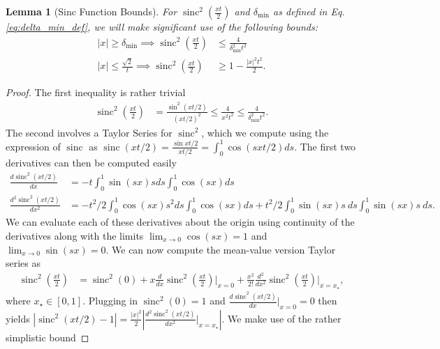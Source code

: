 \documentclass{article}
\newtheorem{lemma}[theorem]{Lemma}
\newcommand{\abs}[1]{\left| #1 \right|}
\DeclareMathOperator{\sinc}{sinc}
\begin{document}
\begin{lemma}[Sinc Function Bounds] \label{lem:sinc_poly_approx}
    For $\sinc^2\left( \frac{x t}{2} \right)$ and $\delta_{\min}$ as defined in Eq. \eqref{eq:delta_min_def}, we will make significant use of the following bounds:
    \begin{align}
        |x| \ge \delta_{\min} \implies \sinc^2 \left( \frac{x t}{2} \right) &\le \frac{4}{\delta_{\min}^2 t^2} \label{eq:sinc_upper_bound} \\
        |x| \le \frac{\sqrt{2}}{t} \implies \sinc^2\left(\frac{x t}{2} \right) &\ge 1 - \frac{|x|^2 t^2}{2}. \label{eq:sinc_lower_bound}
\end{align}

\end{lemma}
\begin{proof}
    The first inequality is rather trivial
    \begin{align}
        \sinc^2 \left( \frac{x t}{2} \right) &= \frac{\sin^2 (x t /2)}{(x t / 2)^2} \le \frac{4}{x^2 t^2} \le \frac{4}{\delta_{\min}^2 t^2}.
    \end{align}
    The second involves a Taylor Series for $\sinc^2$, which we compute using the expression of $\sinc$ as $\sinc(x t/ 2) = \frac{\sin xt /2}{xt/2} = \int_0^1 \cos(sxt/2) ds$.  The first two derivatives can then be computed easily
    \begin{align}
        \frac{d \sinc^2(x t /2)}{dx} &= - t \int_0^1 \sin(sx) s ds \int_0^1 \cos(sx) ds \\
        \frac{d^2 \sinc^2(x t /2)}{dx^2} &= -t^2 / 2 \int_0^1 \cos(sx)s^2 ds \int_0^1 \cos(sx) ds + t^2 / 2 \int_0^1 \sin(sx) s ~ds \int_0^1 \sin(sx) s ~ds.
    \end{align}
    We can evaluate each of these derivatives about the origin using continuity of the derivatives along with the limits $\lim_{x \to 0} \cos(sx) = 1$ and $\lim_{x \to 0} \sin(sx) = 0$. We can now compute the mean-value version Taylor series as
    \begin{align}
        \sinc^2 \left(\frac{x t}{2} \right) &= \sinc^2(0) + x \frac{d}{dx} \sinc^2 \left(\frac{x t}{2} \right) \bigg|_{x = 0} + \frac{x^2}{2!} \frac{d^2}{dx^2} \sinc^2 \left(\frac{x t}{2} \right) \bigg|_{x = x_{\star}},
    \end{align}
    where $x_{\star} \in [0,1]$. 
    Plugging in $\sinc^2(0) = 1$ and $\frac{d\sinc^2(x t /2)}{dx}\big|_{x = 0} = 0$ then yields $|\sinc^2(xt/2) - 1| = \frac{|x|^2}{2} \abs{\frac{d^2\sinc^2(x t / 2)}{dx^2}\big|_{x = x_{\star}}}$. We make use of the rather simplistic bound

\end{proof}
\end{document}
